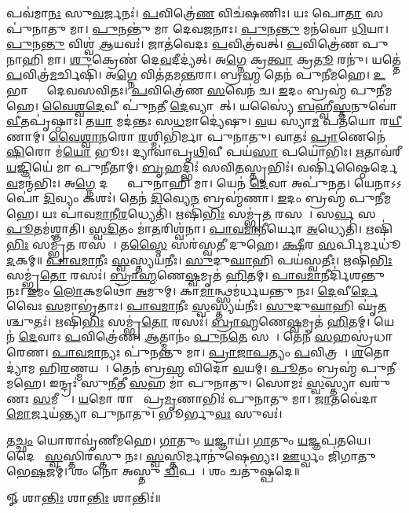 𑌪𑌵॑𑌮𑌾\ul{𑌨𑌃} 𑌸𑍁\ul{𑌵}𑌰𑍍𑌜𑌨𑌃॑। \ul{𑌪}𑌵𑌿𑌤𑍍𑌰𑍇॑\ul{𑌣} 𑌵𑌿𑌚॑\ur{}𑌷𑌣𑌿𑌃। 𑌯𑌃 𑌪𑍋\ul{𑌤𑌾} 𑌸 𑌪𑍁॑𑌨𑌾𑌤𑍁 𑌮𑌾। \ul{𑌪𑍁}𑌨𑌨𑍍𑌤𑍁॑ 𑌮𑌾 𑌦𑍇𑌵\ul{𑌜}𑌨𑌾𑌃।
\ul{𑌪𑍁}𑌨\ul{𑌨𑍍𑌤𑍁} 𑌮𑌨॑𑌵𑍋 \ul{𑌧𑌿}𑌯𑌾। \ul{𑌪𑍁}𑌨\ul{𑌨𑍍𑌤𑍁} 𑌵𑌿𑌶𑍍𑌵॑ \ul{𑌆}𑌯𑌵𑌃॑। 𑌜𑌾𑌤॑𑌵𑍇𑌦𑌃 \ul{𑌪}𑌵𑌿𑌤𑍍𑌰॑𑌵𑌤𑍍। \ul{𑌪}𑌵𑌿𑌤𑍍𑌰𑍇॑𑌣 𑌪𑍁𑌨𑌾𑌹𑌿 𑌮𑌾।
\ul{𑌶𑍁}𑌕𑍍𑌰𑍇𑌣॑ 𑌦𑍇\ul{𑌵}𑌦𑍀𑌦𑍍𑌯॑𑌤𑍍। 𑌅\ul{𑌗𑍍𑌨𑍇} 𑌕𑍍𑌰\ul{𑌤𑍍𑌵𑌾} 𑌕𑍍𑌰\ul{𑌤𑍂}\ul{} 𑌰𑌨𑍁॑। 𑌯𑌤𑍍𑌤𑍇॑ \ul{𑌪}𑌵𑌿𑌤𑍍𑌰॑\ul{𑌮}𑌰𑍍𑌚𑌿𑌷𑌿॑। 𑌅\ul{𑌗𑍍𑌨𑍇} 𑌵𑌿𑌤॑𑌤𑌮\ul{𑌨𑍍𑌤}𑌰𑌾।
𑌬𑍍𑌰\ul{𑌹𑍍𑌮} 𑌤𑍇𑌨॑ 𑌪𑍁𑌨𑍀𑌮𑌹𑍇। \ul{𑌉}𑌭𑌾𑌭𑍍𑌯𑌾𑌂᳚ 𑌦𑍇𑌵𑌸𑌵𑌿𑌤𑌃। \ul{𑌪}𑌵𑌿𑌤𑍍𑌰𑍇॑𑌣 \ul{𑌸}𑌵𑍇𑌨॑ 𑌚। \ul{𑌇}𑌦𑌂 𑌬𑍍𑌰𑌹𑍍𑌮॑ 𑌪𑍁𑌨𑍀𑌮𑌹𑍇।
\ul{𑌵𑍈}\ul{𑌶𑍍𑌵}\ul{𑌦𑍇}𑌵𑍀 𑌪𑍁॑\ul{𑌨}𑌤𑍀 \ul{𑌦𑍇}𑌵𑍍𑌯𑌾𑌗𑌾᳚𑌤𑍍। 𑌯𑌸𑍍𑌯𑍈॑ \ul{𑌬}𑌹𑍍𑌵𑍀\ul{𑌸𑍍𑌤}𑌨𑍁𑌵𑍋॑ \ul{𑌵𑍀}𑌤𑌪𑍃॑𑌷𑍍𑌠𑌾𑌃।
𑌤\ul{𑌯𑌾} 𑌮𑌦॑𑌨𑍍𑌤𑌃 𑌸\ul{𑌧}𑌮𑌾𑌦𑍍𑌯𑍇॑𑌷𑍁। \ul{𑌵}𑌯 𑌸𑍍𑌯𑌾॑\ul{𑌮} 𑌪𑌤॑𑌯𑍋 𑌰\ul{𑌯𑍀}𑌣𑌾𑌮𑍍।
\ul{𑌵𑍈}\ul{𑌶𑍍𑌵𑌾}\ul{𑌨}𑌰𑍋 \ul{𑌰}𑌶𑍍𑌮𑌿𑌭𑌿॑𑌰𑍍𑌮𑌾 𑌪𑍁𑌨𑌾𑌤𑍁। 𑌵𑌾𑌤𑌃॑ \ul{𑌪𑍍𑌰𑌾}𑌣𑍇𑌨𑍇॑\ul{𑌷𑌿}𑌰𑍋 𑌮॑\ul{𑌯𑍋} 𑌭𑍂𑌃।
𑌦𑍍𑌯𑌾𑌵𑌾॑𑌪𑍃\ul{𑌥𑌿}𑌵𑍀 𑌪𑌯॑\ul{𑌸𑌾} 𑌪𑌯𑍋॑𑌭𑌿𑌃। \ul{𑌋}𑌤𑌾𑌵॑𑌰𑍀 \ul{𑌯}𑌜𑍍𑌞𑌿𑌯𑍇॑ 𑌮𑌾 𑌪𑍁𑌨𑍀𑌤𑌾𑌮𑍍।
\ul{𑌬𑍃}𑌹𑌦𑍍𑌭𑌿𑌃॑ 𑌸𑌵𑌿\ul{𑌤}𑌸𑍍𑌤𑍃𑌭𑌿𑌃॑। 𑌵𑌰𑍍{}𑌷𑌿॑𑌷𑍍𑌠𑍈𑌰𑍍𑌦𑍇\ul{𑌵}𑌮𑌨𑍍𑌮॑𑌭𑌿𑌃।
𑌅\ul{𑌗𑍍𑌨𑍇} 𑌦𑌕𑍍𑌷𑍈𑌃᳚ 𑌪𑍁𑌨𑌾𑌹𑌿 𑌮𑌾। 𑌯𑍇𑌨॑ \ul{𑌦𑍇}𑌵𑌾 𑌅𑌪𑍁॑𑌨𑌤।
𑌯𑍇𑌨𑌾𑌽𑌽𑌪𑍋॑ \ul{𑌦𑌿}𑌵𑍍𑌯𑌂 𑌕𑌶𑌃॑। 𑌤𑍇𑌨॑ \ul{𑌦𑌿}𑌵𑍍𑌯𑍇\ul{𑌨} 𑌬𑍍𑌰𑌹𑍍𑌮॑𑌣𑌾। \ul{𑌇}𑌦𑌂 𑌬𑍍𑌰𑌹𑍍𑌮॑ 𑌪𑍁𑌨𑍀𑌮𑌹𑍇। 𑌯𑌃 𑌪𑌾॑𑌵\ul{𑌮𑌾}𑌨𑍀\ul{𑌰}𑌧𑍍𑌯𑍇𑌤𑌿॑।
𑌋𑌷𑌿॑\ul{𑌭𑌿𑌃} 𑌸𑌮𑍍𑌭𑍃॑\ul{𑌤}\ul{} 𑌰𑌸𑌮𑍍᳚। 𑌸\ul{𑌰𑍍𑌵}\ul{} 𑌸 \ul{𑌪𑍂}𑌤𑌮॑𑌶𑍍𑌞𑌾𑌤𑌿।
\ul{𑌸𑍍𑌵}\ul{𑌦𑌿}𑌤𑌂 𑌮𑌾॑\ul{𑌤}𑌰𑌿𑌶𑍍𑌵॑𑌨𑌾। \ul{𑌪𑌾}\ul{𑌵}\ul{𑌮𑌾}𑌨𑍀𑌰𑍍𑌯𑍋 \ul{𑌅}𑌧𑍍𑌯𑍇𑌤𑌿॑।
𑌋𑌷𑌿॑\ul{𑌭𑌿𑌃} 𑌸𑌮𑍍𑌭𑍃॑\ul{𑌤}\ul{} 𑌰𑌸𑌮𑍍᳚। 𑌤\ul{𑌸𑍍𑌮𑍈} 𑌸𑌰॑𑌸𑍍𑌵𑌤𑍀 𑌦𑍁𑌹𑍇। \ul{𑌕𑍍𑌷𑍀}𑌰 \ul{𑌸}𑌰𑍍𑌪𑌿𑌰𑍍𑌮𑌧𑍂॑\ul{𑌦}𑌕𑌮𑍍॥
\ul{𑌪𑌾}\ul{𑌵}\ul{𑌮𑌾}𑌨𑍀𑌃 \ul{𑌸𑍍𑌵}𑌸𑍍𑌤𑍍𑌯𑌯॑𑌨𑍀𑌃। \ul{𑌸𑍁}𑌦𑍁\ul{𑌘𑌾}𑌹𑌿 𑌪𑌯॑𑌸𑍍𑌵𑌤𑍀𑌃।
𑌋𑌷𑌿॑\ul{𑌭𑌿𑌃} 𑌸𑌮𑍍𑌭𑍃॑\ul{𑌤𑍋} 𑌰𑌸𑌃॑। \ul{𑌬𑍍𑌰𑌾}\ul{𑌹𑍍𑌮}𑌣𑍇\ul{𑌷𑍍𑌵}𑌮𑍃𑌤॑ \ul{𑌹𑌿}𑌤𑌮𑍍।
\ul{𑌪𑌾}\ul{𑌵}\ul{𑌮𑌾}𑌨𑍀𑌰𑍍𑌦𑌿॑𑌶𑌨𑍍𑌤𑍁 𑌨𑌃। \ul{𑌇}𑌮𑌂 \ul{𑌲𑍋}𑌕𑌮𑌥𑍋॑ \ul{𑌅}𑌮𑍁𑌮𑍍।
𑌕𑌾\ul{𑌮𑌾}𑌨𑍍𑌥𑍍𑌸𑌮॑𑌰𑍍𑌧𑌯𑌨𑍍𑌤𑍁 𑌨𑌃। \ul{𑌦𑍇}𑌵𑍀\ul{𑌰𑍍𑌦𑍇}𑌵𑍈𑌃 \ul{𑌸}𑌮𑌾𑌭𑍃॑𑌤𑌾𑌃।
\ul{𑌪𑌾}\ul{𑌵}\ul{𑌮𑌾}𑌨𑍀𑌃 \ul{𑌸𑍍𑌵}𑌸𑍍𑌤𑍍𑌯𑌯॑𑌨𑍀𑌃। \ul{𑌸𑍁}𑌦𑍁\ul{𑌘𑌾}𑌹𑌿 𑌘𑍃॑\ul{𑌤}𑌶𑍍𑌚𑍁𑌤𑌃॑।
𑌋𑌷𑌿॑\ul{𑌭𑌿𑌃} 𑌸𑌮𑍍𑌭𑍃॑\ul{𑌤𑍋} 𑌰𑌸𑌃॑। \ul{𑌬𑍍𑌰𑌾}\ul{𑌹𑍍𑌮}𑌣𑍇\ul{𑌷𑍍𑌵}𑌮𑍃𑌤॑ \ul{𑌹𑌿}𑌤𑌮𑍍।
𑌯𑍇𑌨॑ \ul{𑌦𑍇}𑌵𑌾𑌃 \ul{𑌪}𑌵𑌿𑌤𑍍𑌰𑍇॑𑌣। \ul{𑌆}𑌤𑍍𑌮𑌾𑌨𑌂॑ \ul{𑌪𑍁}𑌨\ul{𑌤𑍇} 𑌸𑌦𑌾᳚।
𑌤𑍇𑌨॑ \ul{𑌸}𑌹𑌸𑍍𑌰॑𑌧𑌾𑌰𑍇𑌣। \ul{𑌪𑌾}\ul{𑌵}\ul{𑌮𑌾}𑌨𑍍𑌯𑌃 𑌪𑍁॑𑌨𑌨𑍍𑌤𑍁 𑌮𑌾।
\ul{𑌪𑍍𑌰𑌾}\ul{𑌜𑌾}\ul{𑌪}𑌤𑍍𑌯𑌂 \ul{𑌪}𑌵𑌿𑌤𑍍𑌰𑌮𑍍᳚। \ul{𑌶}𑌤𑍋𑌦𑍍𑌯𑌾॑𑌮 𑌹𑌿\ul{𑌰}𑌣𑍍𑌮𑌯𑌮𑍍᳚।
𑌤𑍇𑌨॑ 𑌬𑍍𑌰\ul{𑌹𑍍𑌮} 𑌵𑌿𑌦𑍋॑ \ul{𑌵}𑌯𑌮𑍍। \ul{𑌪𑍂}𑌤𑌂 𑌬𑍍𑌰𑌹𑍍𑌮॑ 𑌪𑍁𑌨𑍀𑌮𑌹𑍇।
𑌇𑌨𑍍𑌦𑍍𑌰𑌃॑ 𑌸𑍁\ul{𑌨𑍀}𑌤𑍀 \ul{𑌸}𑌹 𑌮𑌾॑ 𑌪𑍁𑌨𑌾𑌤𑍁। 𑌸𑍋𑌮𑌃॑ \ul{𑌸𑍍𑌵}𑌸𑍍𑌤𑍍𑌯𑌾 𑌵𑌰𑍁॑𑌣𑌃 \ul{𑌸}𑌮𑍀𑌚𑍍𑌯𑌾᳚।
\ul{𑌯}𑌮𑍋 𑌰𑌾𑌜𑌾᳚ 𑌪𑍍𑌰\ul{𑌮𑍃}𑌣𑌾𑌭𑌿𑌃॑ 𑌪𑍁𑌨𑌾𑌤𑍁 𑌮𑌾। \ul{𑌜𑌾}𑌤𑌵𑍇॑𑌦𑌾 \ul{𑌮𑍋}𑌰𑍍𑌜𑌯॑𑌨𑍍𑌤𑍍𑌯𑌾 𑌪𑍁𑌨𑌾𑌤𑍁। 𑌭𑍂𑌰𑍍𑌭𑍁\ul{𑌵𑌃} 𑌸𑍁𑌵𑌃॑।

𑌤\ul{𑌚𑍍𑌛𑌂} 𑌯𑍋𑌰𑌾𑌵𑍃॑𑌣𑍀𑌮𑌹𑍇। \ul{𑌗𑌾}𑌤𑍁𑌂 \ul{𑌯}𑌜𑍍𑌞𑌾𑌯॑। \ul{𑌗𑌾}𑌤𑍁𑌂 \ul{𑌯}𑌜𑍍𑌞𑌪॑𑌤𑌯𑍇। 𑌦𑍈𑌵𑍀𑌃᳚ \ul{𑌸𑍍𑌵}𑌸𑍍𑌤𑌿𑌰॑𑌸𑍍𑌤𑍁 𑌨𑌃।
\ul{𑌸𑍍𑌵}𑌸𑍍𑌤𑌿𑌰𑍍𑌮𑌾𑌨𑍁॑𑌷𑍇𑌭𑍍𑌯𑌃। \ul{𑌊}𑌰𑍍𑌧𑍍𑌵𑌂 𑌜𑌿॑𑌗𑌾𑌤𑍁 𑌭𑍇\ul{𑌷}𑌜𑌮𑍍। 𑌶𑌂 𑌨𑍋॑ 𑌅𑌸𑍍𑌤𑍁 \ul{𑌦𑍍𑌵𑌿}𑌪𑌦𑍇᳚। 𑌶𑌂 𑌚𑌤𑍁॑𑌷𑍍𑌪𑌦𑍇॥

\centerline{𑍐 𑌶𑌾\ul{𑌨𑍍𑌤𑌿𑌃} 𑌶𑌾\ul{𑌨𑍍𑌤𑌿𑌃} 𑌶𑌾𑌨𑍍𑌤𑌿𑌃॑॥}
